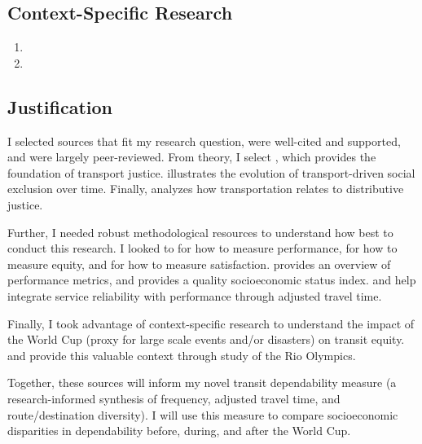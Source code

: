 \documentclass[12pt]{article}
\begin{document}
\subsection{Context-Specific Research}
\begin{enumerate}
    \item {}
    \item {}
\end{enumerate}
\subsection{Justification}
I selected sources that fit my research question, were well-cited and supported, and were largely peer-reviewed.
From theory, I select \citet{martensTransportJusticeDesigning2016}, which provides the foundation of transport justice.
\citet{lucasTransportSocialExclusion2012} illustrates the evolution of transport-driven social exclusion over time.
Finally, \citet{pereiraDistributiveJusticeEquity2017} analyzes how transportation relates to distributive justice.

Further, I needed robust methodological resources to understand how best to conduct this research.
I looked to \citet{fuNewPerformanceIndex2007} for how to measure performance, \citet{welchMeasureEquityPublic2013} for how to measure equity, and \citet{lyuAnalyzingImpactService2026} for how to measure satisfaction.
\citet{draperDefinitionsRailwayPerformance2017} provides an overview of performance metrics, and \citet{allenSizingTransportPoverty2019} provides a quality socioeconomic status index.
\citet{jeneliusPublicTransportExperienced2018} and \citet{vanoortIncorporatingServiceReliability2014} help integrate service reliability with performance through adjusted travel time.

Finally, I took advantage of context-specific research to understand the impact of the World Cup (proxy for large scale events and/or disasters) on transit equity.
\citet{pereiraTransportLegacyMegaevents2018} and \citet{pereiraTransportLegacyMegaevents2020} provide this valuable context through study of the Rio Olympics.

Together, these sources will inform my novel transit dependability measure (a research-informed synthesis of frequency, adjusted travel time, and route/destination diversity).
I will use this measure to compare socioeconomic disparities in dependability before, during, and after the World Cup.
\end{document}
